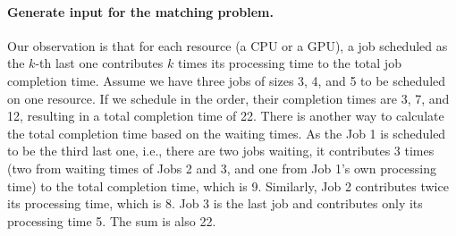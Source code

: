 
\paragraph{Generate input for the matching problem.}


Our observation is that for each resource (a CPU or a GPU), a job scheduled as the $k$-th last one contributes $k$ times its processing time to the total job completion time.
Assume we have three jobs of sizes 3, 4, and 5 to be scheduled on one resource.
If we schedule in the order, their completion times are 3, 7, and 12, resulting in a total completion time of 22. 
There is another way to calculate the total completion time based on the waiting times.
As the Job 1 is scheduled to be the third last one, i.e., there are two jobs waiting, it contributes 3 times (two from waiting times of Jobs 2 and 3, and one from Job 1's own processing time) to the total completion time, which is 9.
Similarly, Job 2 contributes twice its processing time, which is 8.
Job 3 is the last job and contributes only its processing time 5.
The sum is also 22.  



